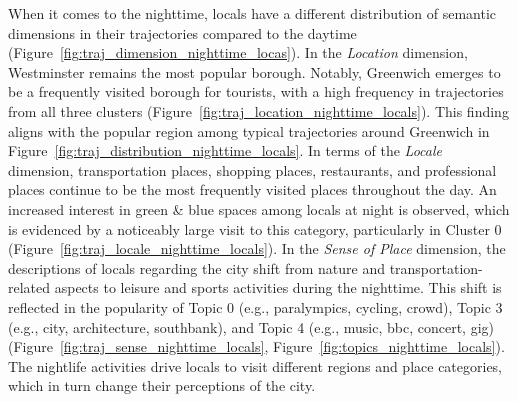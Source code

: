 \documentclass{article}
\theoremstyle{remark}
\begin{document}
When it comes to the nighttime, locals have a different distribution of semantic dimensions in their trajectories compared to the daytime (Figure~\ref{fig:traj_dimension_nighttime_locas}). In the \textit{Location} dimension, Westminster remains the most popular borough. Notably, Greenwich emerges to be a frequently visited borough for tourists, with a high frequency in trajectories from all three clusters (Figure~\ref{fig:traj_location_nighttime_locals}). This finding aligns with the popular region among typical trajectories around Greenwich in Figure~\ref{fig:traj_distribution_nighttime_locals}. In terms of the \textit{Locale} dimension, transportation places, shopping places, restaurants, and professional places continue to be the most frequently visited places throughout the day. An increased interest in green \& blue spaces among locals at night is observed, which is evidenced by a noticeably large visit to this category, particularly in Cluster 0 (Figure~\ref{fig:traj_locale_nighttime_locals}). In the \textit{Sense of Place} dimension, the descriptions of locals regarding the city shift from nature and transportation-related aspects to leisure and sports activities during the nighttime. This shift is reflected in the popularity of Topic 0 (e.g., paralympics, cycling, crowd), Topic 3 (e.g., city, architecture, southbank), and Topic 4 (e.g., music, bbc, concert, gig) (Figure~\ref{fig:traj_sense_nighttime_locals}, Figure~\ref{fig:topics_nighttime_locals}). The nightlife activities drive locals to visit different regions and place categories, which in turn change their perceptions of the city.
\end{document}
